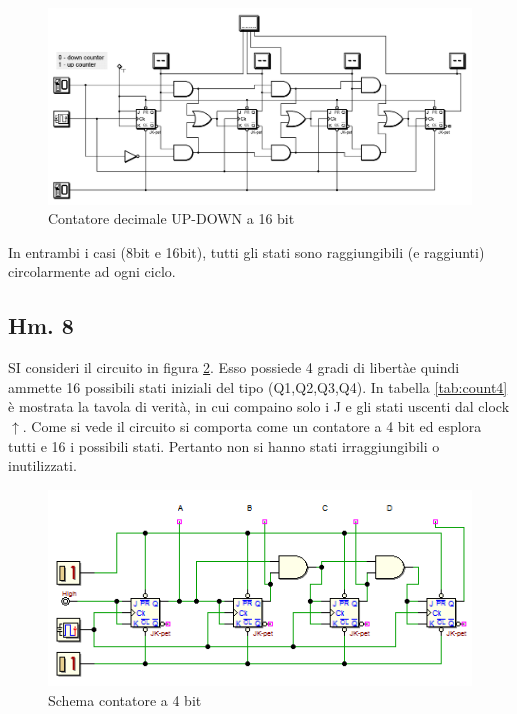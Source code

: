 \documentclass[journal, a4paper]{IEEEtran}
\begin{document}
\begin{figure}
\centering
\includegraphics[width=0.9\linewidth]{./Fig_jk_up_down_counter_16bit}
\caption{Contatore decimale UP-DOWN a 16 bit}
\label{fig:Fig_jk_up_down_counter_16bit}
\end{figure}


In entrambi i casi (8bit e 16bit), tutti gli stati sono raggiungibili (e raggiunti) circolarmente ad ogni ciclo.

\subsection{Hm. 8}

SI consideri il circuito in figura \ref{fig:count4}. Esso possiede 4 gradi di libertàe quindi ammette 16 possibili stati iniziali del tipo (Q1,Q2,Q3,Q4). In tabella \ref{tab:count4} è mostrata la tavola di verità, in cui compaino solo i J e gli stati uscenti dal clock $\uparrow$. Come si vede il circuito si comporta come un contatore a 4 bit ed esplora tutti e 16 i possibili stati. Pertanto non si hanno stati irraggiungibili o inutilizzati.

\begin{figure}[htp]
\centering
\includegraphics[scale=.8]{hm8}
\caption{Schema contatore a 4 bit}
\label{fig:count4}
\end{figure}
\end{document}
